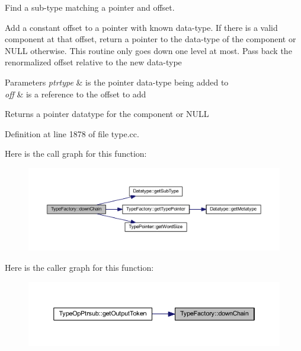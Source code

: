 Find a sub-\/type matching a pointer and offset. 

Add a constant offset to a pointer with known data-\/type. If there is a valid component at that offset, return a pointer to the data-\/type of the component or N\+U\+LL otherwise. This routine only goes down one level at most. Pass back the renormalized offset relative to the new data-\/type 
\begin{DoxyParams}{Parameters}
{\em ptrtype} & is the pointer data-\/type being added to \\
\hline
{\em off} & is a reference to the offset to add \\
\hline
\end{DoxyParams}
\begin{DoxyReturn}{Returns}
a pointer datatype for the component or N\+U\+LL 
\end{DoxyReturn}


Definition at line 1878 of file type.\+cc.

Here is the call graph for this function\+:
\nopagebreak
\begin{figure}[H]
\begin{center}
\leavevmode
\includegraphics[width=350pt]{class_type_factory_a979852b4d0b186f833d16d4638fe6f08_cgraph}
\end{center}
\end{figure}
Here is the caller graph for this function\+:
\nopagebreak
\begin{figure}[H]
\begin{center}
\leavevmode
\includegraphics[width=350pt]{class_type_factory_a979852b4d0b186f833d16d4638fe6f08_icgraph}
\end{center}
\end{figure}
\mbox{\label{class_type_factory_a79cd8d76884043080a3430f3aff8b010}} 
